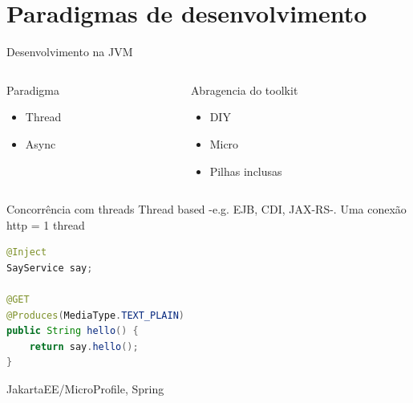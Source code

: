 \documentclass[aspectratio=169]{beamer}
\begin{document}
{
    \section{Paradigmas de desenvolvimento}
}



\begin{frame}[fragile]{Desenvolvimento na JVM}
    \begin{columns}
    
        \begin{column}{0.5\textwidth}
        Paradigma
            \begin{itemize}
                \item Thread 
                \item Async
            \end{itemize}
        \end{column}
        \begin{column}{0.5\textwidth}  %
        Abragencia do toolkit
            \begin{itemize}
                \item DIY
                \item Micro
                \item Pilhas inclusas
            \end{itemize}
        \end{column}
    \end{columns}
\end{frame}


\begin{frame}[fragile]{Concorrência com threads}
Thread based -e.g. EJB, CDI, JAX-RS-. Uma conexão http = 1 thread
\begin{lstlisting}[language=Java]
@Inject
SayService say;

@GET
@Produces(MediaType.TEXT_PLAIN)
public String hello() {
    return say.hello();
}
\end{lstlisting}

JakartaEE/MicroProfile, Spring
\end{frame}
\end{document}
